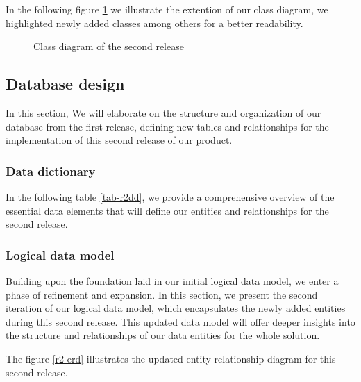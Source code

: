 \noindent In the following figure \ref{r2-class} we illustrate the extention of our class diagram, we highlighted
newly added classes among others for a better readability.

\begin{landscape}
    \begin{figure}[hbt!]
        \centering
        
        \caption{Class diagram of the second release}
        \label{r2-class}
    \end{figure}
\end{landscape}

\subsection{Database design}
In this section, We will elaborate on the structure and organization of our database from the first release,
defining new tables and relationships for the implementation of this second release of our product.

\subsubsection{Data dictionary}
In the following table \ref{tab-r2dd}, we provide a comprehensive overview of the essential data elements
that will define our entities and relationships for the second release.

\subsubsection{Logical data model}
Building upon the foundation laid in our initial logical data model, we enter a phase of refinement and
expansion. In this section, we present the second iteration of our logical data model, which encapsulates
the newly added entities during this second release. This updated data model will offer
deeper insights into the structure and relationships of our data entities for the whole solution.

\noindent The figure \ref{r2-erd} illustrates the updated entity-relationship diagram for this second release.

